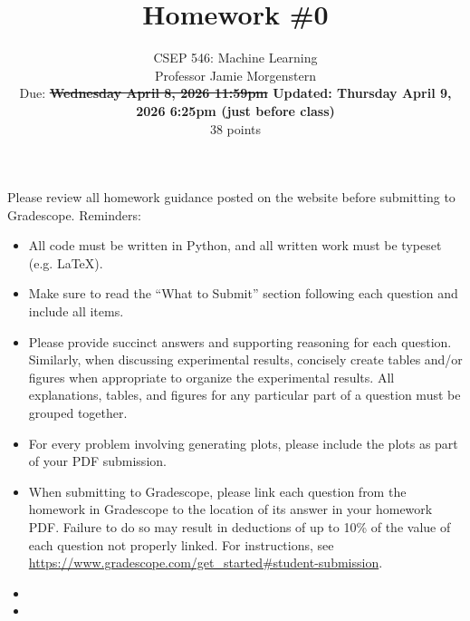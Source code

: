 \documentclass{article}
\begin{document}
\setcounter{aprob}{0}
\setcounter{bprob}{0}
\title{Homework \#0}
\author{
    \normalsize{CSEP 546: Machine Learning}\\
    \normalsize{Professor Jamie Morgenstern}\\
    \normalsize{Due: \textbf{\sout{Wednesday April 8, 2026 11:59pm} \; Updated: Thursday April 9, 2026 6:25pm (just before class)}}\\
    \normalsize{38 points}
}
\date{{}}
\maketitle

\noindent Please review all homework guidance posted on the website before submitting to Gradescope. Reminders:
\begin{itemize}
    \item All code must be written in Python, and all written work must be typeset (e.g. \LaTeX{}).
    \item Make sure to read the ``What to Submit'' section following each question and include all items.
    \item Please provide succinct answers and supporting reasoning for each question. Similarly, when discussing experimental results, concisely create tables and/or figures when appropriate to organize the experimental results. All explanations, tables, and figures for any particular part of a question must be grouped together.
    \item For every problem involving generating plots, please include the plots as part of your PDF submission.
    \item When submitting to Gradescope, please link each question from the homework in Gradescope to the location of its answer in your homework PDF. Failure to do so may result in deductions of up to 10\% of the value of each question not properly linked. For instructions, see \url{https://www.gradescope.com/get_started#student-submission}.
    \item {}
    \item {}
\end{itemize}
\end{document}
